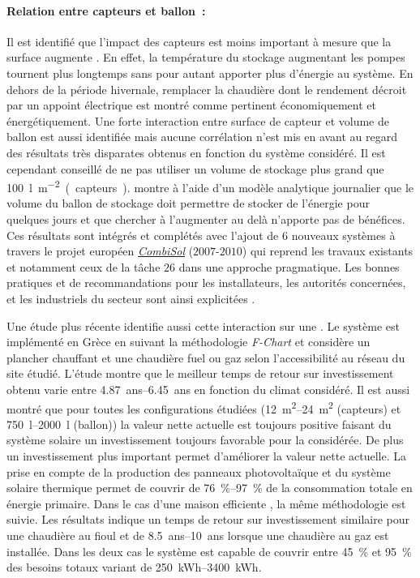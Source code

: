 \paragraph{Relation entre capteurs et ballon~:} %
\label{par:relation_entre_capteurs_et_ballon}
Il est identifié que l’impact des capteurs est moins important à mesure
que la surface augmente \parencite{Task26C2007}. En effet, la température du stockage augmentant les pompes
tournent plus longtemps sans pour autant apporter plus d’énergie au système. En dehors
de la période hivernale, remplacer la chaudière dont le rendement décroit par un appoint
électrique est montré comme pertinent économiquement et énergétiquement.
Une forte interaction entre surface de capteur et volume de ballon est aussi identifiée
mais aucune corrélation n’est mis en avant au regard des résultats très disparates
obtenus en fonction du système considéré. Il est cependant conseillé de ne pas utiliser
un volume de stockage plus grand que \SI{100}{\litre\per\metre\squared (capteurs)}.
\textcite{Lund200559} montre à l’aide d’un modèle analytique journalier que le volume
du ballon de stockage doit permettre de stocker de l’énergie pour quelques jours et que
chercher à l’augmenter au delà n’apporte pas de bénéfices.
Ces résultats sont intégrés et complétés avec l’ajout de $6$ nouveaux systèmes à travers
le projet européen \href{http://www.combisol.eu/}{\textit{CombiSol}} ($2007$-$2010$) qui reprend
les travaux existants et notamment ceux de la tâche $26$ dans une approche pragmatique.
Les bonnes pratiques et de recommandations pour les installateurs, les autorités concernées,
et les industriels du secteur sont ainsi explicitées \parencite{Thuer2011}.

Une étude plus récente \parencite{Tsalikis2015743} identifie aussi cette interaction sur
une . Le système est implémenté en Grèce en suivant la méthodologie
\textit{F-Chart} et considère un plancher chauffant et une chaudière fuel ou gaz selon
l’accessibilité au réseau du site étudié. L’étude montre que le meilleur temps de retour
sur investissement obtenu varie entre \SIrange{4.87}{6.45}{ans} en fonction du climat
considéré. Il est aussi montré que pour toutes les configurations étudiées
(\SIrange{12}{24}{\metre\squared} (capteurs) et \SIrange{750}{2000}{\litre} (ballon))
la valeur nette actuelle est toujours positive faisant du système solaire un
investissement toujours favorable pour la  considérée. De plus un
investissement plus important permet d’améliorer la valeur nette actuelle. La prise en
compte de la production des panneaux photovoltaïque et du système solaire thermique permet
de couvrir de \SIrange{76}{97}{\percent} de la consommation totale en énergie primaire.
Dans le cas d’une maison efficiente \parencite{Martinopoulos2014130}, la même méthodologie
est suivie. Les résultats indique un temps de retour sur investissement similaire pour une
chaudière au fioul et de \SIrange{8.5}{10}{ans} lorsque une chaudière au gaz est installée.
Dans les deux cas le système est capable de couvrir entre \SI{45}{\percent} et
\SI{95}{\percent} des besoins totaux variant de \SIrange{250}{3400}{kWh}.

